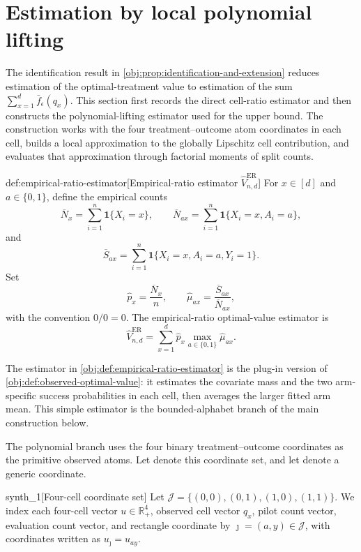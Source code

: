 \section{Estimation by local polynomial lifting}

The identification result in \cref{obj:prop:identification-and-extension} reduces estimation of the optimal-treatment value to estimation of the sum \(\sum_{x=1}^d \bar f_\epsilon(q_x)\). This section first records the direct cell-ratio estimator and then constructs the polynomial-lifting estimator used for the upper bound. The construction works with the four treatment--outcome atom coordinates in each cell, builds a local approximation to the globally Lipschitz cell contribution, and evaluates that approximation through factorial moments of split counts.

\begin{definitionv}{def:empirical-ratio-estimator}[Empirical-ratio estimator \(\widehat V_{n,d}^{\mathrm{ER}}\)]
For \(x\in[d]\) and \(a\in\{0,1\}\), define the empirical counts
\[
\overline N_x
=
\sum_{i=1}^n \mathbf 1\{X_i=x\},
\qquad
\overline N_{ax}
=
\sum_{i=1}^n \mathbf 1\{X_i=x,A_i=a\},
\]
and
\[
\overline S_{ax}
=
\sum_{i=1}^n \mathbf 1\{X_i=x,A_i=a,Y_i=1\}.
\]
Set
\[
\widehat p_x=\frac{\overline N_x}{n},
\qquad
\widehat\mu_{ax}=\frac{\overline S_{ax}}{\overline N_{ax}},
\]
with the convention \(0/0=0\). The empirical-ratio optimal-value estimator is
\[
\widehat V_{n,d}^{\mathrm{ER}}
=
\sum_{x=1}^d \widehat p_x \max_{a\in\{0,1\}}\widehat\mu_{ax}.
\]
\end{definitionv}

The estimator in \cref{obj:def:empirical-ratio-estimator} is the plug-in version of \cref{obj:def:observed-optimal-value}: it estimates the covariate mass and the two arm-specific success probabilities in each cell, then averages the larger fitted arm mean. This simple estimator is the bounded-alphabet branch of the main construction below.

The polynomial branch uses the four binary treatment--outcome coordinates as the primitive observed atoms. Let  denote this coordinate set, and let  denote a generic coordinate.

\begin{definitionv}{synth_1}[Four-cell coordinate set]
Let \(\mathcal J=\{(0,0),(0,1),(1,0),(1,1)\}\). We index each four-cell vector \(u\in\mathbb R_+^4\), observed cell vector \(q_x\), pilot count vector, evaluation count vector, and rectangle coordinate by \(\jmath=(a,y)\in\mathcal J\), with coordinates written as \(u_{\jmath}=u_{ay}\).
\end{definitionv}

